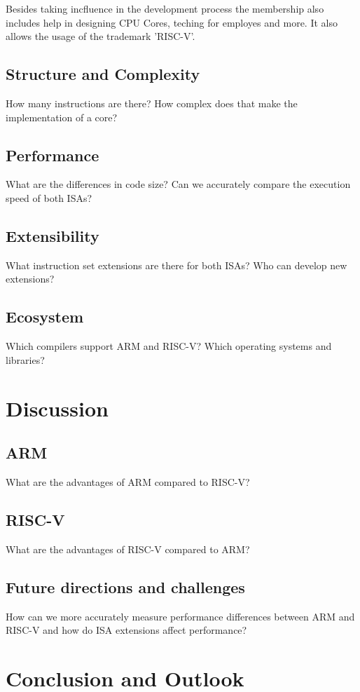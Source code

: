 \documentclass[conference]{IEEEtran}
\begin{document}
	Besides taking incfluence in the development process the membership also includes help in designing \gls{CPU} Cores, teching for employes and more. It also allows the usage of the trademark 'RISC-V'.

	\subsection{Structure and Complexity}
	How many instructions are there? How complex does that make the implementation of a core?
	\subsection{Performance}
	What are the differences in code size? Can we accurately compare the execution speed of both ISAs?
	\subsection{Extensibility}
	What instruction set extensions are there for both ISAs? Who can develop new extensions?
	\subsection{Ecosystem}
	Which compilers support ARM and RISC-V? Which operating systems and libraries?


\section{Discussion}
\label{ref:discussion}
	\subsection{ARM}
	What are the advantages of ARM compared to RISC-V?
	\subsection{RISC-V}
	What are the advantages of RISC-V compared to ARM?
	\subsection{Future directions and challenges}
	How can we more accurately measure performance differences between ARM and RISC-V and how do ISA extensions affect performance?

\section{Conclusion and Outlook}
\label{ref:conclusion}
\end{document}
